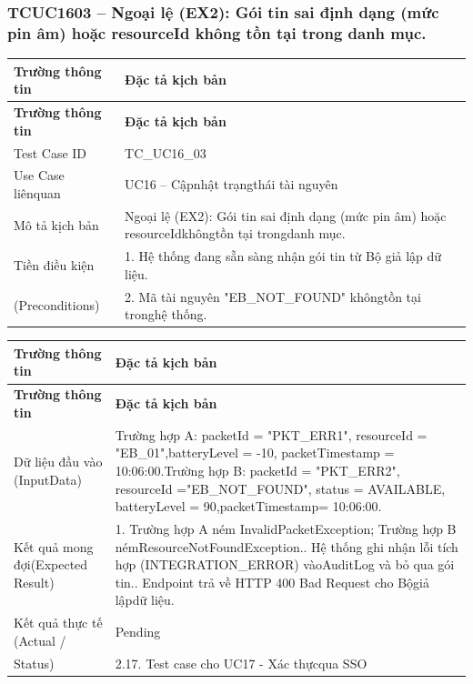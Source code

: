 \subsubsection{TCUC1603 – Ngoại lệ (EX2): Gói tin sai định dạng (mức pin âm) hoặc resourceId không tồn tại trong danh mục.}
\begin{longtable}{|L{0.24\textwidth}|L{0.70\textwidth}|}
\hline
\textbf{Trường thông tin} & \textbf{Đặc tả kịch bản} \\
\hline
\endfirsthead
\hline
\textbf{Trường thông tin} & \textbf{Đặc tả kịch bản} \\
\hline
\endhead
Test Case ID & TC\_UC16\_03 \\
\hline
Use Case liênquan & UC16 – Cậpnhật trạngthái tài nguyên \\
\hline
Mô tả kịch bản & Ngoại lệ (EX2): Gói tin sai định dạng (mức pin âm) hoặc resourceId\newline khôngtồn tại trongdanh mục. \\
\hline
Tiền điều kiện & 1. Hệ thống đang sẵn sàng nhận gói tin từ Bộ giả lập dữ liệu. \\
\hline
(Preconditions) & 2. Mã tài nguyên "EB\_NOT\_FOUND" khôngtồn tại tronghệ thống. \\
\hline
\end{longtable}
\vspace{-0.5\baselineskip}
\begin{longtable}{|L{0.24\textwidth}|L{0.70\textwidth}|}
\hline
\textbf{Trường thông tin} & \textbf{Đặc tả kịch bản} \\
\hline
\endfirsthead
\hline
\textbf{Trường thông tin} & \textbf{Đặc tả kịch bản} \\
\hline
\endhead
Dữ liệu đầu vào (Input\newline Data) & Trường hợp A: packetId = "PKT\_ERR1", resourceId = "EB\_01",\newline batteryLevel = -10, packetTimestamp = 10:06:00.\newline Trường hợp B: packetId = "PKT\_ERR2", resourceId =\newline "EB\_NOT\_FOUND", status = AVAILABLE, batteryLevel = 90,\newline packetTimestamp= 10:06:00. \\
\hline
Kết quả mong đợi\newline (Expected Result) & 1. Trường hợp A ném InvalidPacketException; Trường hợp B ném\newline ResourceNotFoundException.. Hệ thống ghi nhận lỗi tích hợp (INTEGRATION\_ERROR) vào\newline AuditLog và bỏ qua gói tin.. Endpoint trả về HTTP 400 Bad Request cho Bộgiả lậpdữ liệu. \\
\hline
Kết quả thực tế (Actual / & Pending \\
\hline
Status) & 2.17. Test case cho UC17 - Xác thựcqua SSO \\
\hline
\end{longtable}
\vspace{-0.5\baselineskip}
